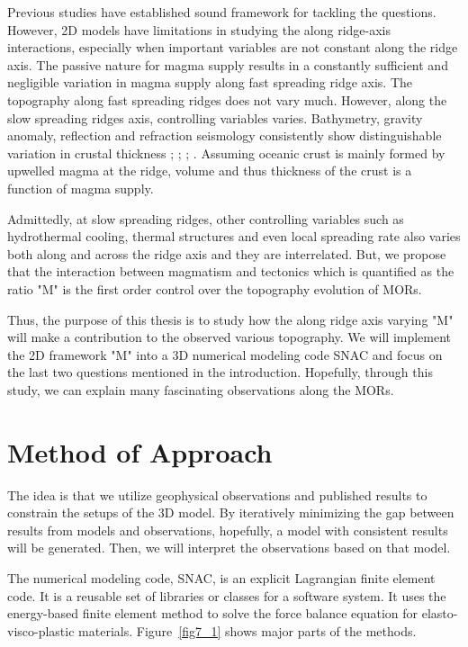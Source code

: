 \documentclass[12pt]{article}
\begin{document}
Previous studies have established sound framework for tackling the questions. However, 2D models have limitations in studying the along ridge-axis interactions, especially when important variables are not constant along the ridge axis. The passive nature for magma supply results in a constantly sufficient and negligible variation in magma supply along fast spreading ridge axis. The topography along fast spreading ridges does not vary much. However, along the slow spreading ridges axis, controlling variables varies. Bathymetry, gravity anomaly, reflection and refraction seismology consistently show distinguishable variation in crustal thickness \citep{Ryan2009}; \citep{Chen1999}; \citep{Lin1990}; \citep{Tolstoy1993}. Assuming oceanic crust is mainly formed by upwelled magma at the ridge, volume and thus thickness of the crust is a function of magma supply.

Admittedly, at slow spreading ridges, other controlling variables such as hydrothermal cooling, thermal structures and even local spreading rate \citep{Baines2008} also varies both along and across the ridge axis and they are interrelated. But, we propose that the interaction between magmatism and tectonics which is quantified as the ratio "M" is the first order control over the topography evolution of MORs. 

Thus, the purpose of this thesis is to study how the along ridge axis varying "M" will make a contribution to the observed various topography. We will implement the 2D framework "M" into a 3D numerical modeling code SNAC \citep{Choi2008} and focus on the last two questions mentioned in the introduction. Hopefully, through this study, we can explain many fascinating observations along the MORs.

\break
\section{Method of Approach}
\label{ch:method}

The idea is that we utilize geophysical observations and published results to constrain the setups of the 3D model. By iteratively minimizing the gap between results from models and observations, hopefully, a model with consistent results will be generated. Then, we will interpret the observations based on that model.

The numerical modeling code, SNAC, is an explicit Lagrangian finite element code. It is a reusable set of libraries or classes for a software system. It uses the energy-based finite element method to solve the force balance equation for elasto-visco-plastic materials. Figure~\ref{fig7_1} shows major parts of the methods.
\end{document}
